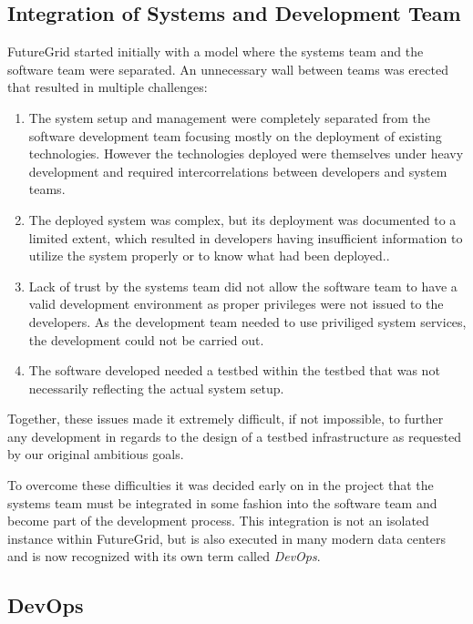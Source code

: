 \documentclass{article}
\begin{document}
\subsection{Integration of Systems and Development Team}


FutureGrid started initially with a model where the systems team and the software team were separated. An unnecessary wall between teams was erected that resulted in multiple challenges:


\begin{enumerate}


\item The system setup and management were completely separated from the software development team focusing mostly on the deployment of existing technologies. However the technologies deployed were themselves under heavy development and required intercorrelations between developers and system teams.


\item The deployed system was complex, but its deployment was documented to a limited extent, which resulted in developers having insufficient information to utilize the system properly or to know what had been deployed..


\item Lack of trust by the systems team did not allow the software team to have a valid development environment as proper privileges were not issued to the developers. As the development team needed to use priviliged system services, the development could not be carried out.


\item The software developed needed a testbed within the testbed that was not necessarily reflecting the actual system setup.


\end{enumerate}


Together, these issues made it extremely difficult, if not impossible, to further any development in regards to the design of a testbed infrastructure as requested by our original ambitious goals.


To overcome these difficulties it was decided early on in the project that the systems team must be integrated in some fashion into the software team and become part of the development process. This integration is not an isolated instance within FutureGrid, but is also executed in many modern data centers and is now recognized with its own term called {\em DevOps}.


\subsection{DevOps}
\end{document}
